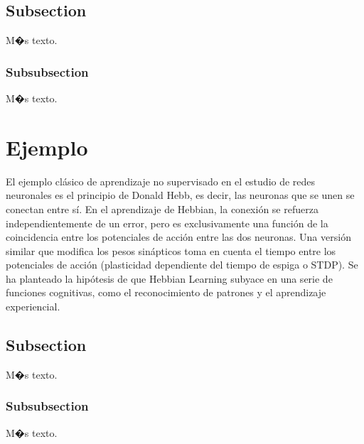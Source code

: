 \documentclass{article}
\theoremstyle{definition}
\theoremstyle{remark}
\begin{document}

\subsection{Subsection}\label{sec:nada}

M�s texto.

\subsubsection{Subsubsection}\label{sec:nada2}

M�s texto.





\section{Ejemplo}

El ejemplo clásico de aprendizaje no supervisado en el estudio de redes neuronales es el principio de Donald Hebb, es decir, las neuronas que se unen se conectan entre sí. En el aprendizaje de Hebbian, la conexión se refuerza independientemente de un error, pero es exclusivamente una función de la coincidencia entre los potenciales de acción entre las dos neuronas. Una versión similar que modifica los pesos sinápticos toma en cuenta el tiempo entre los potenciales de acción (plasticidad dependiente del tiempo de espiga o STDP). Se ha planteado la hipótesis de que Hebbian Learning subyace en una serie de funciones cognitivas, como el reconocimiento de patrones y el aprendizaje experiencial.

\subsection{Subsection}\label{sec:nada}

M�s texto.

\subsubsection{Subsubsection}\label{sec:nada2}

M�s texto.
\end{document}
